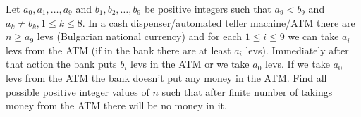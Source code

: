 Let $a_0, a_1, \ldots, a_9$ and $b_1 , b_2, \ldots,b_9$ be positive integers such that $a_9<b_9$ and $a_k \neq b_k, 1 \leq k \leq 8.$ In a cash dispenser/automated teller machine/ATM there are $n\geq a_9$ levs (Bulgarian national currency) and for each $1 \leq i \leq 9$ we can take $a_i$ levs from the ATM  (if in the bank there are at least $a_i$ levs).  Immediately after that action the bank puts $b_i$ levs in the ATM or we take $a_0$ levs. If we take $a_0$ levs from the ATM the bank doesn’t put any money in the ATM. Find all possible positive integer values of $n$ such that after finite number of takings money from the ATM there will be no money in it.
